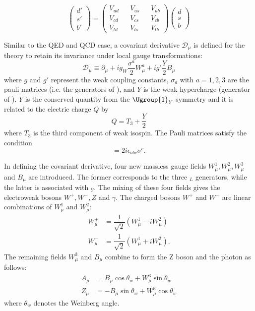 \begin{equation}
    \begin{pmatrix}
        d'\\
        s'\\
        b'
    \end{pmatrix}
    =
    \begin{pmatrix} 
        V_{ud} && V_{us} && V_{ub}\\ 
        V_{cd} && V_{cs} && V_{cb}\\
        V_{td} && V_{ts} && V_{tb}
    \end{pmatrix}
        \begin{pmatrix}
        d\\
        s\\
        b
    \end{pmatrix}
\end{equation}

Similar to the QED and QCD case, a covariant derivative $\mathcal{D}_{\mu}$ is defined for the theory to retain its invariance under local gauge transformations:
\begin{equation}
    \mathcal{D}_{\mu}\equiv \partial_{\mu}+ig_W\dfrac{\sigma^a}{2}W^a_{\mu}+ig'\dfrac{Y}{2}B_{\mu}
\end{equation}
where $g$ and $g'$ represent the weak coupling constants, $\sigma_a$ with $a=1,2,3$ are the pauli matrices (i.e. the generators of ), and $Y$ is the weak hypercharge (generator of ). $Y$ is the conserved quantity from the $\Ugroup{1}_Y$ symmetry and it is related to the electric charge $Q$ by
\begin{equation}
    Q=T_3+\dfrac{Y}{2}
\end{equation}
where $T_3$ is the third component of weak isospin.
The Pauli matrices satisfy the condition
\begin{equation}
    [\sigma_a,\sigma_b]=2i\epsilon_{abc}\sigma^c.
\end{equation}

In defining the covariant derivative, four new massless gauge fields $W^1_{\mu}, W^2_{\mu}, W^3_{\mu}$ and $B_{\mu}$ are introduced. The former corresponds to the three $_L$ generators, while the latter is associated with $_Y$. The mixing of these four fields gives the electroweak bosons $W^+,W^-,Z$ and $\gamma$. The charged bosons $W^+$ and $W^-$ are linear combinations of $W^1_{\mu}$ and $W^2_{\mu}$:
\begin{align}
    W^+_{\mu} & =\dfrac{1}{\sqrt{2}}(W_{\mu}^1-iW_{\mu}^2)\\
    W^-_{\mu} & =\dfrac{1}{\sqrt{2}}(W_{\mu}^1+iW_{\mu}^2).
\end{align}
The remaining fields $W_{\mu}^3$ and $B_{\mu}$ combine to form the Z boson and the photon as follows:
\begin{align}
    A_{\mu} & =B_{\mu}\cos\theta_{w}+W^3_{\mu}\sin\theta_w\\
    Z_{\mu} & =-B_{\mu}\sin\theta_{w}+W^3_{\mu}\cos\theta_w
\end{align}
where $\theta_w$ denotes the Weinberg angle.

